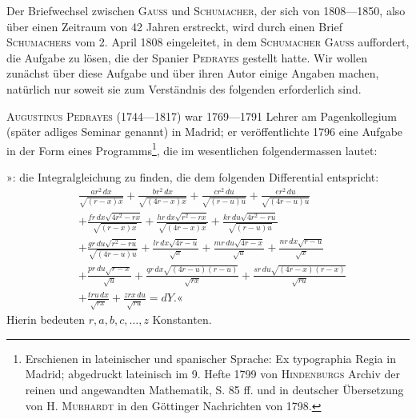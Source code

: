 \par\medskip
\begin{center}
\end{center}
\noindent\hspace*{\parindent}Der Briefwechsel zwischen \textsc{Gauss} und \textsc{Schumacher}, der sich von 1808—1850,
also über einen Zeitraum von 42 Jahren erstreckt, wird durch einen
Brief \textsc{Schumachers} vom 2. April 1808 eingeleitet, in dem \textsc{Schumacher} \textsc{Gauss}
auffordert, die Aufgabe zu lösen, die der Spanier \textsc{Pedrayes} gestellt hatte. Wir
wollen zunächst über diese Aufgabe und über ihren Autor einige Angaben
machen, natürlich nur soweit sie zum Verständnis des folgenden erforderlich
sind.
\par
\textsc{Augustinus Pedrayes} (1744—1817) war 1769—1791 Lehrer am Pagenkollegium
(später adliges Seminar genannt) in Madrid; er veröffentlichte 1796
eine Aufgabe in der Form eines Programms\footnote{Erschienen in lateinischer und spanischer Sprache: Ex typographia Regia in Madrid; abgedruckt lateinisch im 9. Hefte 1799 von \textsc{Hindenburgs} Archiv der reinen und angewandten Mathematik, S. 85 ff. und in deutscher Übersetzung von H. \textsc{Murhardt} in den Göttinger Nachrichten von 1798.}, die im wesentlichen folgendermassen
lautet:\par
\clearpage{}
\indent »: die Integralgleichung zu finden, die dem folgenden Differential entspricht:
\[
\begin{aligned}
&\frac{ar^2\,dx}{\sqrt{(r-x)x}}+\frac{br^2\,dx}{\sqrt{(4r-x)x}}
+\frac{cr^2\,du}{\sqrt{(r-u)u}}+\frac{er^2\,du}{\sqrt{(4r-u)u}}\\[5pt]
&+\frac{fr\,dx\sqrt{4r^2-rx}}{\sqrt{(r-x)x}}
+\frac{hr\,dx\sqrt{r^2-rx}}{\sqrt{(4r-x)x}}
+\frac{kr\,du\sqrt{4r^2-ru}}{\sqrt{(r-u)u}}\\[5pt]
&+\frac{gr\,du\sqrt{r^2-ru}}{\sqrt{(4r-u)u}}
+\frac{lr\,dx\sqrt{4r-u}}{\sqrt{x}}
+\frac{mr\,du\sqrt{4r-x}}{\sqrt{u}}
+\frac{nr\,dx\sqrt{r-u}}{\sqrt{x}}\\[5pt]
&+\frac{pr\,du\sqrt{r-x}}{\sqrt{u}}
+\frac{qr\,dx\sqrt{(4r-u)(r-u)}}{\sqrt{rx}}
+\frac{sr\,du\sqrt{(4r-x)(r-x)}}{\sqrt{ru}}\\[5pt]
&+\frac{tru\,dx}{\sqrt{rx}}+\frac{zrx\,du}{\sqrt{ru}}=dY.\text{«}
\end{aligned}
\]
\noindent Hierin bedeuten \(r,a,b,c,\ldots,z\) Konstanten.
